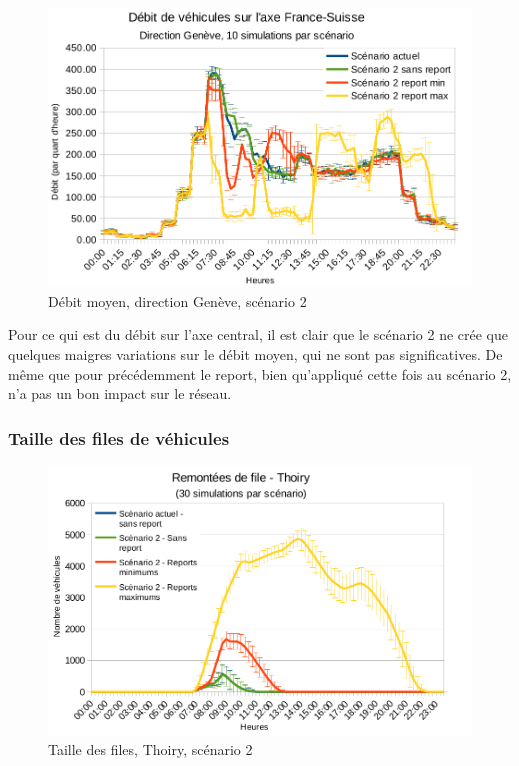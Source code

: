 \documentclass[a4paper,11pt, titlepage]{extarticle}
\begin{document}
\begin{figure}[!h]
  \begin{center}
    \includegraphics[width=13cm]{graphiques/compteur_1a_scenario2.png}
  \end{center}
  \vspace{-0.8cm}
  \caption{Débit moyen, direction Genève, scénario 2}
  \label{graphCompteur1AScenario2}
\end{figure}

Pour ce qui est du débit sur l'axe central, il est clair que le scénario 2 ne crée que quelques maigres variations sur le débit moyen, qui ne sont pas significatives. De même que pour précédemment le report, bien qu'appliqué cette fois au scénario 2, n'a pas un bon impact sur le réseau.

\subsubsection{Taille des files de véhicules}

\begin{figure}[!h]
  \begin{center}
    \includegraphics[width=13cm]{graphiques/leakyB_thoiry_s2.png}
  \end{center}
  \vspace{-0.8cm}
  \caption{Taille des files, Thoiry, scénario 2}
  \label{graphLBThoiryS2}
\end{figure}
\end{document}
